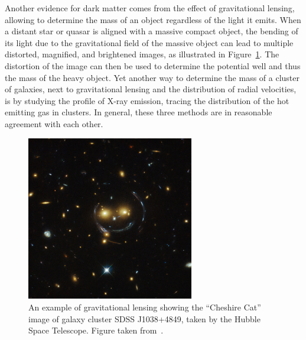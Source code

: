 Another evidence for dark matter comes from the effect of gravitational lensing, allowing to determine the mass of an object regardless of the light it emits. When a distant star or quasar is aligned with a massive compact object, the bending of its light due to the gravitational field of the massive object can 
lead to multiple distorted, magnified, and brightened images, as illustrated in Figure~\ref{fig:gravitational_lensing}. The distortion of the image can then be used to determine the potential well and thus the mass of the heavy object. Yet another way to determine the mass of a cluster of galaxies, next to gravitational lensing and the distribution of radial velocities, is by studying the profile of X-ray emission, tracing the distribution of the hot emitting gas in clusters. In general, these three methods are in reasonable agreement with each other.

\begin{figure}[ht]
  \centering
  \includegraphics[width=0.65\textwidth]{cat.jpg}\hfill%
  \caption{An example of gravitational lensing showing the ``Cheshire Cat'' image of galaxy cluster  SDSS J1038+4849, taken by the Hubble Space Telescope. Figure taken from~\cite{Belokurov:2008pu}.}
  \label{fig:gravitational_lensing}
\end{figure}

